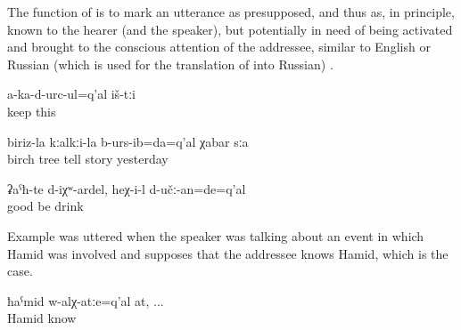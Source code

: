 The function of  is to mark an utterance as presupposed, and thus as, in principle, known to the hearer (and the speaker), but potentially in need of being activated and brought to the conscious attention of the addressee, similar to English  or Russian  (which is used for the translation of  into Russian) .
%
\begin{exe}
	\ex	\label{ex:These (pictures) do not fit (on the table or in that order) minor}
	\gll	a-ka-d-urc-ul=q'al	iš-tːi\\
		keep	this\\
	\glt	{}

	\ex	\label{ex:Yesterday I already told the story about the birch tree minor}
	\gll	biriz-la	kːalkːi-la	b-urs-ib=da=q'al	χabar	sːa\\
		birch	tree	tell	story	yesterday\\
	\glt	{}

	\ex	\label{ex:If (the drinks) would be good, he would drink them minor}
	\gll	ʡaˁħ-te	d-iχʷ-ardel,	heχ-i-l	d-učː-an=de=q'al\\
		good 	be	 drink\\
	\glt	{}
\end{exe}

Example  was uttered when the speaker was talking about an event in which Hamid was involved and supposes that the addressee knows Hamid, which is the case.
%
\begin{exe}
	\ex	\label{ex:Hamid, if you know him minor}
	\gll	ħaˁmid	w-alχ-atːe=q'al	at, ...\\
		Hamid	know	\\
	\glt	{}
\end{exe}

